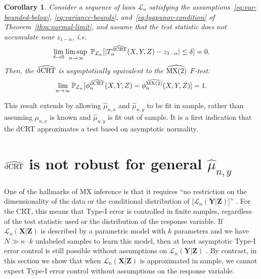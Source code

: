\documentclass[12pt]{article}
\newtheorem{corollary}{Corollary}
\theoremstyle{definition}
\theoremstyle{remark}
\newcommand\linktoproof[1]{ {\normalfont[{\hyperlink{#1}{Proof}}]} }
\renewcommand{\P}{\mathbb{P}}							%
\newcommand{\prx}{\bm X}								%
\newcommand{\srx}{X}									%
\newcommand{\prz}{\bm Z}								%
\newcommand{\srz}{Z}									%
\newcommand{\pry}{{\bm Y}}								%
\newcommand{\sry}{Y}									%
\newcommand{\law}{\mathcal L}							%
\newcommand{\dCRThat}{\widehat{\textnormal{dCRT}}}		%
\newcommand{\MXtwohat}{\widehat{\textnormal{MX(2)}}}		%
\begin{document}
	\begin{corollary} \label{cor:asymptotic-equivalence} \linktoproof{proof:thm:normal-limit}
		Consider a sequence of laws $\law_n$ satisfying the assumptions~\eqref{eq:var-bounded-below}, \eqref{eq:variance-bounds}, and~\eqref{eq:lyapunov-condition} of Theorem~\ref{thm:normal-limit}, and assume that the test statistic does not accumulate near $z_{1-\alpha}$, i.e.
		\begin{equation}
			\lim_{\delta \rightarrow 0}\limsup_{n \rightarrow \infty}\ \P_{\law_n}[|T_n^{\dCRThat}(\srx, \sry, \srz)-z_{1-\alpha}| \leq \delta] = 0.
			\label{eq:non-accumulation}
		\end{equation}
		Then, the $\dCRThat$ is asymptotically equivalent to the $\MXtwohat$ $F$-test:
		\begin{equation}
			\lim_{n \rightarrow \infty}\P_{\law_n}[\phi_n^{\dCRThat}(\srx, \sry, \srz) = \phi_n^{\MXtwohat}(\srx, \sry, \srz)] = 1.
		\end{equation}
		
	\end{corollary}

	This result extends \citet[Theorem 2]{Katsevich2020a} by allowing $\widehat \mu_{n,x}$ and $\widehat \mu_{n,y}$ to be fit in sample, rather than assuming $\mu_{n,x}$ is known and $\widehat \mu_{n,y}$ is fit out of sample. It is a first indication that the dCRT approximates a test based on asymptotic normality.
	
	
	\section{$\dCRThat$ is not robust for general $\widehat \mu_{n,y}$} \label{sec:neg-results}
	
	One of the hallmarks of MX inference is that it requires ``no restriction on the dimensionality of the data or the conditional distribution of [$\law_n(\pry|\prz)$]'' \citep{CetL16}. For the CRT, this means that Type-I error is controlled in finite samples, regardless of the test statistic used or the distribution of the response variable. If $\law_n(\prx|\prz)$ is described by a parametric model with $k$ parameters and we have $N \gg n \cdot k$ unlabeled samples to learn this model, then at least asymptotic Type-I error control is still possible without assumptions on $\law_n(\pry|\prz)$ \citep{Berrett2019}. By contrast, in this section we show that when $\law_n(\prx|\prz)$ is approximated in sample, we cannot expect Type-I error control without assumptions on the response variable.
	
\end{document}
